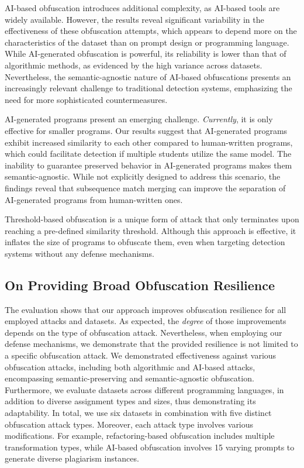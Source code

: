 AI-based obfuscation introduces additional complexity, as AI-based tools are widely available. However, the results reveal significant variability in the effectiveness of these obfuscation attempts, which appears to depend more on the characteristics of the dataset than on prompt design or programming language. While AI-generated obfuscation is powerful, its reliability is lower than that of algorithmic methods, as evidenced by the high variance across datasets. Nevertheless, the semantic-agnostic nature of AI-based obfuscations presents an increasingly relevant challenge to traditional detection systems, emphasizing the need for more sophisticated countermeasures.

AI-generated programs present an emerging challenge. \textit{Currently}, it is only effective for smaller programs. Our results suggest that AI-generated programs exhibit increased similarity to each other compared to human-written programs, which could facilitate detection if multiple students utilize the same model.
The inability to guarantee preserved behavior in AI-generated programs makes them semantic-agnostic.
While not explicitly designed to address this scenario, the findings reveal that subsequence match merging can improve the separation of AI-generated programs from human-written ones.

Threshold-based obfuscation is a unique form of attack that only terminates upon reaching a pre-defined similarity threshold. Although this approach is effective, it inflates the size of programs to obfuscate them, even when targeting detection systems without any defense mechanisms.


\subsection{On Providing Broad Obfuscation Resilience}

The evaluation shows that our approach improves obfuscation resilience for all employed attacks and datasets. As expected, the \textit{degree} of those improvements depends on the type of obfuscation attack. Nevertheless, when employing our defense mechanisms, we demonstrate that the provided resilience is not limited to a specific obfuscation attack. 
We demonstrated effectiveness against various obfuscation attacks, including both algorithmic and AI-based attacks, encompassing semantic-preserving and semantic-agnostic obfuscation.
Furthermore, we evaluate datasets across different programming languages, in addition to diverse assignment types and sizes, thus demonstrating its adaptability.
In total, we use six datasets in combination with five distinct obfuscation attack types. Moreover, each attack type involves various modifications. For example, refactoring-based obfuscation includes multiple transformation types, while AI-based obfuscation involves 15 varying prompts to generate diverse plagiarism instances.

